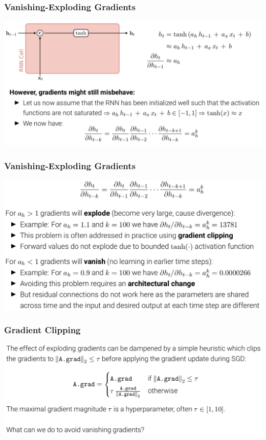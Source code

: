 \documentclass[10pt]{beamer}
\begin{document}
\begin{frame}
  \frametitle{Vanishing-Exploding Gradients}
\begin{center}
\includegraphics[width=\textwidth]{images/s14}
\end{center}
\end{frame}


\begin{frame}
  \frametitle{Vanishing-Exploding Gradients}
\begin{center}
\includegraphics[width=.95\textwidth]{images/s15}
\end{center}
\end{frame}


\begin{frame}
  \frametitle{Gradient Clipping}
\begin{center}
\includegraphics[width=\textwidth]{images/s16}
\end{center}
\end{frame}
\end{document}
